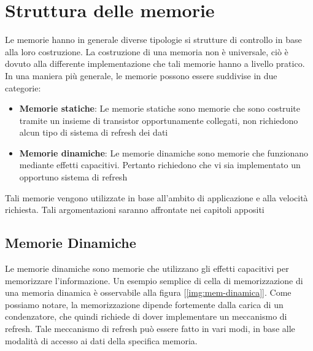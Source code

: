 \section{Struttura delle memorie}
Le memorie hanno in generale diverse tipologie si strutture di controllo in base alla loro costruzione. La costruzione di una memoria non è universale, ciò è dovuto alla differente implementazione che tali memorie hanno a livello pratico. In una maniera più generale, le memorie possono essere suddivise in due categorie:
\begin{itemize}
    \item \textbf{Memorie statiche}: Le memorie statiche sono memorie che sono costruite tramite un insieme di transistor opportunamente collegati, non richiedono alcun tipo di sistema di refresh dei dati
    \item \textbf{Memorie dinamiche}: Le memorie dinamiche sono memorie che funzionano mediante effetti capacitivi. Pertanto richiedono che vi sia implementato un opportuno sistema di refresh
\end{itemize}
Tali memorie vengono utilizzate in base all'ambito di applicazione e alla velocità richiesta. Tali argomentazioni saranno affrontate nei capitoli appositi

\subsection{Memorie Dinamiche}
Le memorie dinamiche sono memorie che utilizzano gli effetti capacitivi per memorizzare l'informazione. Un esempio semplice di cella di memorizzazione di una memoria dinamica è osservabile alla figura [\ref{img:mem-dinamica}]. Come possiamo notare, la memorizzazione dipende fortemente dalla carica di un condenzatore, che quindi richiede di dover implementare un meccanismo di refresh. Tale meccanismo di refresh può essere fatto in vari modi, in base alle modalità di accesso ai dati della specifica memoria.


